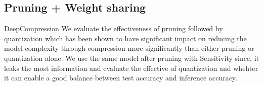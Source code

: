 




\subsection{Pruning + Weight sharing}
DeepCompression
We evaluate the effectiveness of pruning followed by quantization which has been shown to have significant impact on reducing the model complexity through compression more significantly than either pruning or quantization alone.
We use the same model after pruning with Sensitivity since, it leaks the most information and evaluate the effective of quantization and whehter it can enable a good balance between test accuracy and inference accuracy.



